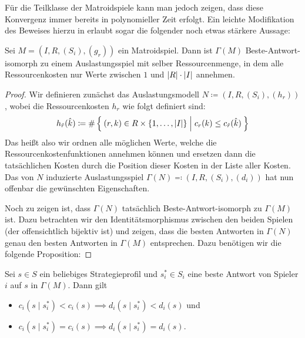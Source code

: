 Für die Teilklasse der Matroidspiele kann man jedoch zeigen, dass diese Konvergenz immer bereits in polynomieller Zeit erfolgt. Ein leichte Modifikation des Beweises hierzu in \cite[Theorem 2.5]{BAPfadLaengeInAusl} erlaubt sogar die folgender noch etwas stärkere Aussage:

\begin{satz}\label{satz:BAPotentialFuerMatroidspiele}
	Sei $M = (I, R, (S_i), (g_r))$ ein Matroidspiel. Dann ist $\Gamma(M)$ Beste-Antwort-isomorph zu einem Auslastungsspiel mit selber Ressourcenmenge, in dem alle Ressourcenkosten nur Werte zwischen $1$ und $\left|R\right|\cdot\left|I\right|$ annehmen.
\end{satz}

\begin{proof}
	Wir definieren zunächst das Auslastungsmodell $N \coloneqq (I, R, (S_i), (h_r))$, wobei die Ressourcenkosten $h_r$ wie folgt definiert sind:
		\[h_{\hat{r}}(\hat{k}) \coloneqq \#\Set{(r, k) \in R\times \{1, \dots, \left|I\right|\} | c_r(k) \leq c_{\hat{r}}(\hat{k})} \]
	Das heißt also wir ordnen alle möglichen Werte, welche die Ressourcenkostenfunktionen annehmen können und ersetzen dann die tatsächlichen Kosten durch die Position dieser Kosten in der Liste aller Kosten. Das von $N$ induzierte Auslastungsspiel $\Gamma(N) \eqqcolon (I, R, (S_i), (d_i))$ hat nun offenbar die gewünschten Eigenschaften. 
	
	Noch zu zeigen ist, dass $\Gamma(N)$ tatsächlich Beste-Antwort-isomorph zu $\Gamma(M)$ ist. Dazu betrachten wir den Identitätsmorphismus zwischen den beiden Spielen (der offensichtlich bijektiv ist) und zeigen, dass die besten Antworten in $\Gamma(N)$ genau den besten Antworten in $\Gamma(M)$ entsprechen. Dazu benötigen wir die folgende Proposition:	\noqed
\end{proof}
	
\begin{prop}\label{prop:BAPotentialFuerMatroidspieleHilfsP}
	Sei $s \in S$ ein beliebiges Strategieprofil und $s^\ast_i \in S_i$ eine beste Antwort von Spieler $i$ auf $s$ in $\Gamma(M)$. Dann gilt
	\begin{itemize}
		\item $c_i(s \mid s^\ast_i) < c_i(s) \implies d_i(s \mid s^\ast_i) < d_i(s)$ und
		\item $c_i(s \mid s^\ast_i) = c_i(s) \implies d_i(s \mid s^\ast_i) = d_i(s)$.
	\end{itemize}
\end{prop}

